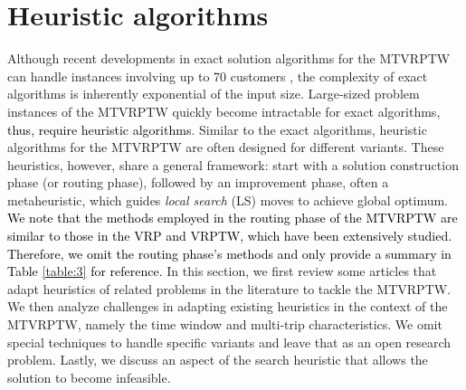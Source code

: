 \documentclass[11pt]{article}
\newcommand\add[1]{\textcolor{black}{#1}}
\begin{document}

\section{Heuristic algorithms}
\label{sec:heuristics}

Although recent developments in exact solution algorithms for the MTVRPTW can handle instances involving up to 70 customers \citep{yang2023exact}, the complexity of exact algorithms is inherently exponential of the input size.  Large-sized problem instances of the MTVRPTW quickly become intractable for exact algorithms, \add{thus, require heuristic algorithms}.  Similar to the exact algorithms, heuristic algorithms for the MTVRPTW are often designed for different variants.  These heuristics, however, share a general framework: start with a solution construction phase (or routing phase), followed by an improvement phase, often a metaheuristic, which guides \textit{local search} (LS) moves to achieve global optimum.  \add{We note that the methods employed in the routing phase of the MTVRPTW are similar to those in the VRP and VRPTW, which have been extensively studied. Therefore, we omit the routing phase's methods and only provide a summary in Table \ref{table:3} for reference.}  In this section, we first review some articles that adapt heuristics of related problems in the literature to tackle the MTVRPTW.  We then analyze challenges in adapting existing heuristics in the context of the MTVRPTW, namely the time window and multi-trip characteristics.  We omit special techniques to handle specific variants and leave that as an open research problem.  Lastly, we discuss an aspect of the search heuristic that allows the solution to become infeasible.
\newline

\end{document}
